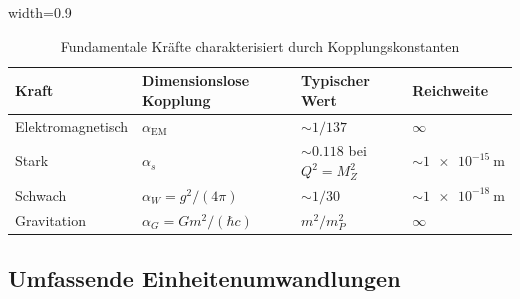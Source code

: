 	\begin{table}[htbp]
		\centering
		\begin{adjustbox}{width=0.9\textwidth}
			\begin{tabular}{llll}
				\toprule
				\textbf{Kraft} & \textbf{Dimensionslose Kopplung} & \textbf{Typischer Wert} & \textbf{Reichweite} \\
				\midrule
				Elektromagnetisch & $\alpha_{\text{EM}}$ & $\sim 1/137$ & $\infty$ \\
				Stark & $\alpha_s$ & $\sim 0.118$ bei $Q^2 = M_Z^2$ & $\sim \SI{1e-15}{\meter}$ \\
				Schwach & $\alpha_W = g^2/(4\pi)$ & $\sim 1/30$ & $\sim \SI{1e-18}{\meter}$ \\
				Gravitation & $\alpha_G = G m^2/(\hbar c)$ & $m^2/m_P^2$ & $\infty$ \\
				\bottomrule
			\end{tabular}
		\end{adjustbox}
		\caption{Fundamentale Kräfte charakterisiert durch Kopplungskonstanten}
		\label{tab:kraefte}
	\end{table}
	
	\subsection{Umfassende Einheitenumwandlungen}
	
